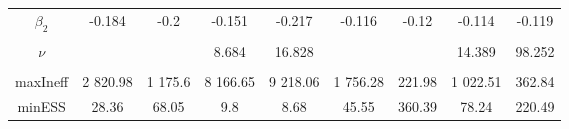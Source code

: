 \begin{footnotesize}
\begin{singlespace}
\begin{tabular}{ccccccccc}
$ \beta_{2} $ & -0.184 & -0.2 & -0.151 & -0.217 & -0.116 & -0.12 & -0.114 & -0.119 \\ 
 & \begin{tiny} [-0.272,-0.097] \end{tiny}  & \begin{tiny} [-0.292,-0.109] \end{tiny}  & \begin{tiny} [-0.236,-0.07] \end{tiny}  & \begin{tiny} [-0.32,-0.116] \end{tiny}  & \begin{tiny} [-0.221,-0.008] \end{tiny}  & \begin{tiny} [-0.209,-0.033] \end{tiny}  & \begin{tiny} [-0.223,-0.005] \end{tiny}  & \begin{tiny} [-0.204,-0.03] \end{tiny}  \\ 
$\nu$ &  &  & 8.684 & 16.828 &  &  & 14.389 & 98.252 \\ 
 &  &  & \begin{tiny} [6.4,11.2] \end{tiny}  & \begin{tiny} [10.8,24.2] \end{tiny}  &  &  & \begin{tiny} [10.4,18.2] \end{tiny}  & \begin{tiny} [60.4, 128] \end{tiny}  \\  \midrule 
maxIneff & 2 820.98 & 1 175.6 & 8 166.65 & 9 218.06 & 1 756.28 &  221.98 & 1 022.51 &  362.84 \\ 
minESS & 28.36 & 68.05 & 9.8 & 8.68 & 45.55 &  360.39 & 78.24 &  220.49 \\ \bottomrule 
\end{tabular}
\end{singlespace}
\end{footnotesize}

